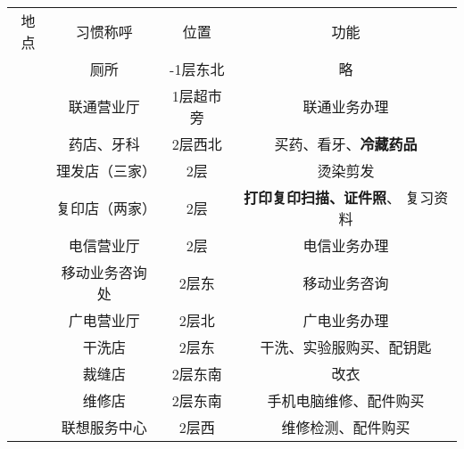 \begin{table}[H]
    \centering
    \begin{tabular}{|c|c|c|c|}
        \Xhline{1.2pt}
        地点                    & 习惯称呼                  & 位置         & 功能                           \\
        \Xhline{1.2pt}
        \multirow{16}{*}{大服}  & 厕所                    & -1层东北      & 略                            \\
        \cline{2-4}
                              & 联通营业厅                 & 1层超市旁      & 联通业务办理                       \\
        \cline{2-4}
                              & 药店、牙科                 & 2层西北       &                              %
        买药、看牙、\textbf{冷藏药品}                                                                       \\
        \cline{2-4}
                              & 理发店（三家）               & 2层         & 烫染剪发                         \\
        \cline{2-4}
                              & 复印店（两家）               & 2层         &                              %
        \textbf{打印复印扫描、证件照}、 复习资料                                                                 \\
        \cline{2-4}
                              & 电信营业厅                 & 2层         & 电信业务办理                       \\
        \cline{2-4}
                              & 移动业务咨询处               & 2层东        & 移动业务咨询                       \\
        \cline{2-4}
                              & 广电营业厅                 & 2层北        & 广电业务办理                       \\
        \cline{2-4}
                              & 干洗店                   & 2层东        & 干洗、实验服购买、配钥匙                 \\
        \cline{2-4}
                              & 裁缝店                   & 2层东南       & 改衣                           \\
        \cline{2-4}
                              & 维修店                   & 2层东南       & 手机电脑维修、配件购买                  \\
        \cline{2-4}
                              & 联想服务中心                & 2层西        & 维修检测、配件购买                    \\

\end{tabular}
\end{table}

